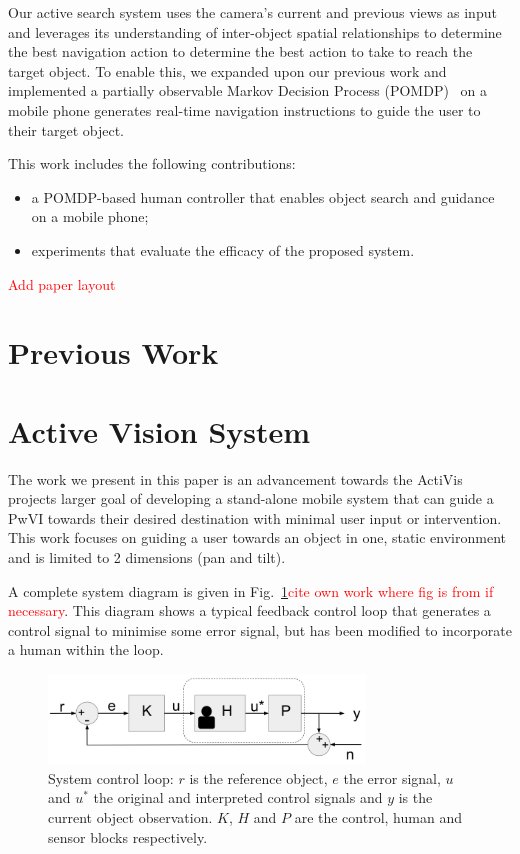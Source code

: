 \documentclass[runningheads]{llncs}
\newcommand\todo[1]{\textcolor{red}{#1}}
\begin{document}
Our active search system uses the camera's current and previous views as input and leverages its understanding of inter-object spatial relationships to determine the best navigation action to determine the best action to take to reach the target object.
To enable this, we expanded upon our previous work and implemented a partially observable Markov Decision Process (POMDP)~\cite{bellman1957markovian} on a mobile phone generates real-time navigation instructions to guide the user to their target object.

This work includes the following contributions:

\begin{itemize}
  \item a POMDP-based human controller that enables object search and guidance on a mobile phone;
  \item experiments that evaluate the efficacy of the proposed system.
\end{itemize}

\todo{Add paper layout}

\section{Previous Work}

\section{Active Vision System}

The work we present in this paper is an advancement towards the ActiVis projects larger goal of developing a stand-alone mobile system that can guide a PwVI towards their desired destination with minimal user input or intervention. 
This work focuses on guiding a user towards an object in one, static environment and is limited to 2 dimensions (pan and tilt).

A complete system diagram is given in Fig.~\ref{fig:sys-diagram}\todo{cite own work where fig is from if necessary}. 
This diagram shows a typical feedback control loop that generates a control signal to minimise some error signal, but has been modified to incorporate a human within the loop.

\begin{figure}
  \centering
  \includegraphics[width=0.75\textwidth]{figures/control_loop.png}
  \caption{System control loop: $r$ is the reference object, $e$ the error signal, $u$ and $u^*$ the original and interpreted control signals and $y$ is the current object observation. $K$, $H$ and $P$ are the control, human and sensor blocks respectively. }\label{fig:sys-diagram}
\end{figure}
\end{document}
